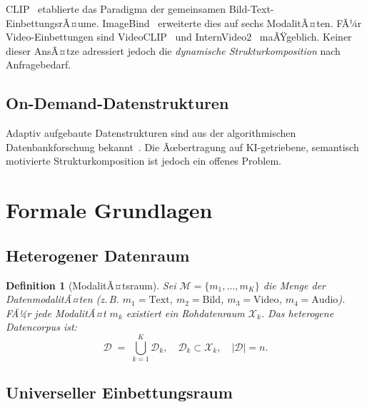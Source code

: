 ﻿\documentclass[12pt,a4paper]{article}
\newtheorem{definition}[theorem]{Definition}
\begin{document}
CLIP~\cite{radford2021clip} etablierte das Paradigma der gemeinsamen 
Bild-Text-Einbet\-tungs\-rÃ¤ume. ImageBind~\cite{girdhar2023imagebind} 
erweiterte dies auf sechs ModalitÃ¤ten. FÃ¼r Video-Einbettungen sind 
VideoCLIP~\cite{xu2021videoclip} und InternVideo2~\cite{wang2024internvideo2} 
maÃŸgeblich. Keiner dieser AnsÃ¤tze adressiert jedoch die 
\emph{dynamische Strukturkomposition} nach Anfragebedarf.

\subsection{On-Demand-Datenstrukturen}

Adaptiv aufgebaute Datenstrukturen sind aus der algorithmischen 
Datenbankforschung bekannt~\cite{idreos2007database}. Die Ãœbertragung 
auf KI-getriebene, semantisch motivierte Strukturkomposition ist 
jedoch ein offenes Problem.

\section{Formale Grundlagen}
\label{sec:grundlagen}

\subsection{Heterogener Datenraum}

\begin{definition}[ModalitÃ¤tsraum]
\label{def:modalitaet}
Sei $\mathcal{M} = \{m_1, \dots, m_K\}$ die Menge der DatenmodalitÃ¤ten 
(z.\,B. $m_1 = \text{Text}$, $m_2 = \text{Bild}$, $m_3 = \text{Video}$, 
$m_4 = \text{Audio}$). FÃ¼r jede ModalitÃ¤t $m_k$ existiert ein 
Rohdatenraum $\mathcal{X}_k$. Das heterogene Datencorpus ist:
\[
  \mathcal{D} \;=\; \bigcup_{k=1}^{K} \mathcal{D}_k,
  \quad \mathcal{D}_k \subset \mathcal{X}_k,
  \quad |\mathcal{D}| = n.
\]
\end{definition}

\subsection{Universeller Einbettungsraum}
\end{document}
